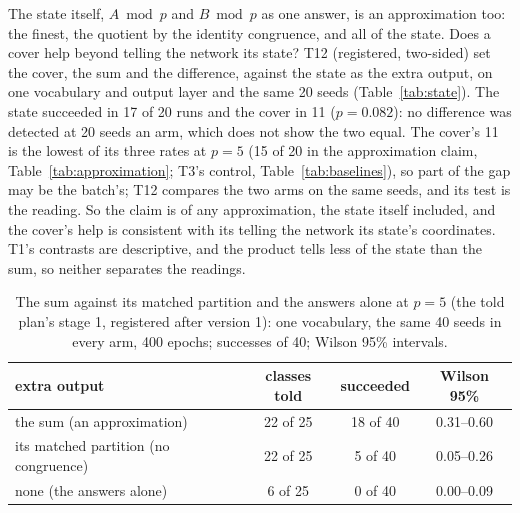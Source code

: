 \documentclass[11pt]{article}
\newcommand{\pn}[2]{#2}
\begin{document}
The state itself, $A \bmod p$ and $B \bmod p$ as one answer, is an approximation too: the finest,
the quotient by the identity congruence, and all of the state. Does a cover help beyond telling the
network its state? T12 (registered, two-sided) set the cover, the sum and the difference, against the
state as the extra output, on one vocabulary and output layer and the same 20 seeds
(Table~\ref{tab:state}). The state succeeded in \pn{t12.state}{17} of 20 runs and the cover in
\pn{t12.cover}{11} ($p = \pn{t12.p}{0.082}$): no difference was detected at 20 seeds an arm, which
does not show the two equal. The cover's 11 is the lowest of its three rates at
$p = 5$ (\pn{k4.claim-cover}{15} of 20 in the approximation claim, Table~\ref{tab:approximation};
T3's control, Table~\ref{tab:baselines}), so part of the gap may be the batch's; T12 compares the
two arms on the same seeds, and its test is the reading. So the claim is of any approximation, the
state itself included, and the cover's help is consistent with its telling the network its state's
coordinates. T1's contrasts are descriptive, and the product tells less of the state than the sum,
so neither separates the readings.

\begin{table}[t]
\centering
\caption{The sum against its matched partition and the answers alone at $p = 5$ (the told plan's
stage 1, registered after version 1): one vocabulary, the same 40 seeds in every arm, 400 epochs;
successes of 40; Wilson 95\% intervals.}
\label{tab:matched}
\begin{tabular}{lccc}
\toprule
extra output & classes told & succeeded & Wilson 95\% \\
\midrule
the sum (an approximation) & 22 of 25 & 18 of 40 & 0.31--0.60 \\
its matched partition (no congruence) & 22 of 25 & 5 of 40 & 0.05--0.26 \\
none (the answers alone) & 6 of 25 & 0 of 40 & 0.00--0.09 \\
\bottomrule
\end{tabular}
\end{table}
\end{document}
